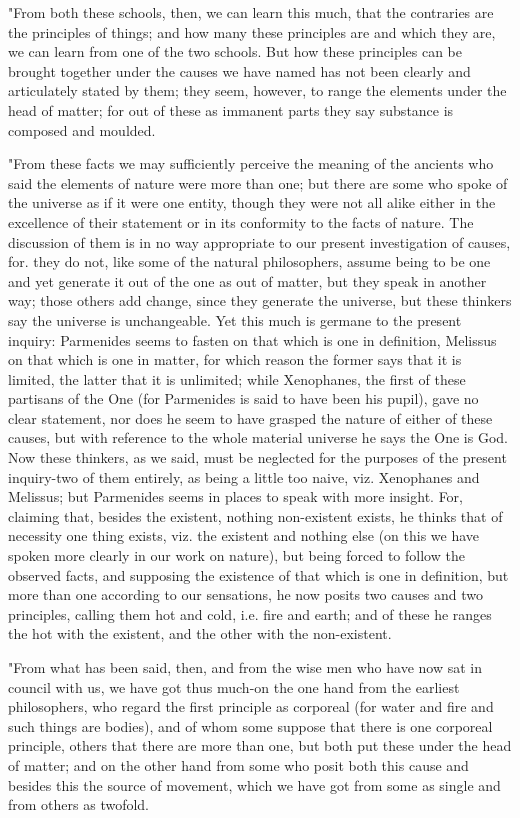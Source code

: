 "From both these schools, then, we can learn this much, that the contraries
are the principles of things; and how many these principles are and
which they are, we can learn from one of the two schools. But how
these principles can be brought together under the causes we have
named has not been clearly and articulately stated by them; they seem,
however, to range the elements under the head of matter; for out of
these as immanent parts they say substance is composed and moulded.

"From these facts we may sufficiently perceive the meaning of the
ancients who said the elements of nature were more than one; but there
are some who spoke of the universe as if it were one entity, though
they were not all alike either in the excellence of their statement
or in its conformity to the facts of nature. The discussion of them
is in no way appropriate to our present investigation of causes, for.
they do not, like some of the natural philosophers, assume being to
be one and yet generate it out of the one as out of matter, but they
speak in another way; those others add change, since they generate
the universe, but these thinkers say the universe is unchangeable.
Yet this much is germane to the present inquiry: Parmenides seems
to fasten on that which is one in definition, Melissus on that which
is one in matter, for which reason the former says that it is limited,
the latter that it is unlimited; while Xenophanes, the first of these
partisans of the One (for Parmenides is said to have been his pupil),
gave no clear statement, nor does he seem to have grasped the nature
of either of these causes, but with reference to the whole material
universe he says the One is God. Now these thinkers, as we said, must
be neglected for the purposes of the present inquiry-two of them entirely,
as being a little too naive, viz. Xenophanes and Melissus; but Parmenides
seems in places to speak with more insight. For, claiming that, besides
the existent, nothing non-existent exists, he thinks that of necessity
one thing exists, viz. the existent and nothing else (on this we have
spoken more clearly in our work on nature), but being forced to follow
the observed facts, and supposing the existence of that which is one
in definition, but more than one according to our sensations, he now
posits two causes and two principles, calling them hot and cold, i.e.
fire and earth; and of these he ranges the hot with the existent,
and the other with the non-existent. 

"From what has been said, then, and from the wise men who have now
sat in council with us, we have got thus much-on the one hand from
the earliest philosophers, who regard the first principle as corporeal
(for water and fire and such things are bodies), and of whom some
suppose that there is one corporeal principle, others that there are
more than one, but both put these under the head of matter; and on
the other hand from some who posit both this cause and besides this
the source of movement, which we have got from some as single and
from others as twofold. 

